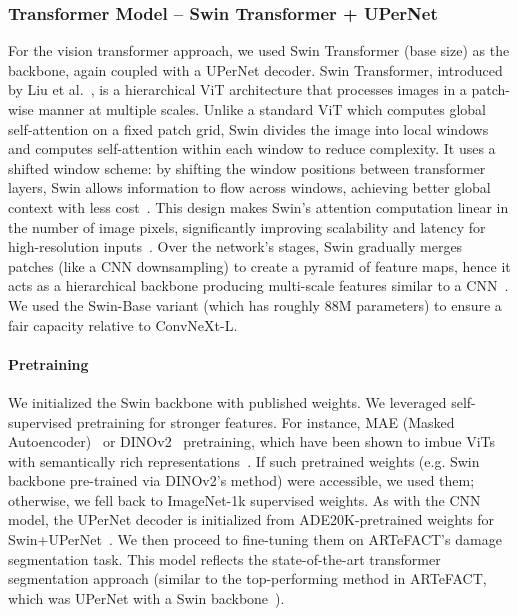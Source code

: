 \documentclass[conference]{IEEEtran}
\begin{document}
\subsubsection{Transformer Model – Swin Transformer + UPerNet} 
For the vision transformer approach, we used Swin Transformer (base size) as the backbone, again coupled with a UPerNet decoder. Swin Transformer, introduced by Liu et al.~\cite{liu_swin_2021}, is a hierarchical ViT architecture that processes images in a patch-wise manner at multiple scales. Unlike a standard ViT which computes global self-attention on a fixed patch grid, Swin divides the image into local windows and computes self-attention within each window to reduce complexity. It uses a shifted window scheme: by shifting the window positions between transformer layers, Swin allows information to flow across windows, achieving better global context with less cost~\cite{liu_swin_2021}. This design makes Swin’s attention computation linear in the number of image pixels, significantly improving scalability and latency for high-resolution inputs~\cite{liu_swin_2021}. Over the network’s stages, Swin gradually merges patches (like a CNN downsampling) to create a pyramid of feature maps, hence it acts as a hierarchical backbone producing multi-scale features similar to a CNN~\cite{liu_swin_2021}. We used the Swin-Base variant (which has roughly 88M parameters) to ensure a fair capacity relative to ConvNeXt-L. 
\paragraph{Pretraining}
We initialized the Swin backbone with published weights. We leveraged self-supervised pretraining for stronger features. For instance, MAE (Masked Autoencoder)~\cite{arslan_masked_2025} or DINOv2~\cite{oquab_dinov2_2024} pretraining, which have been shown to imbue ViTs with semantically rich representations~\cite{ivanova_artefact_2024}. If such pretrained weights (e.g. Swin backbone pre-trained via DINOv2’s method) were accessible, we used them; otherwise, we fell back to ImageNet-1k supervised weights. As with the CNN model, the UPerNet decoder is initialized from ADE20K-pretrained weights for Swin+UPerNet~\cite{ivanova_artefact_2024}. We then proceed to fine-tuning them on ARTeFACT's damage segmentation task. This model reflects the state-of-the-art transformer segmentation approach (similar to the top-performing method in ARTeFACT, which was UPerNet with a Swin backbone~\cite{ivanova_artefact_2024}).
\end{document}
